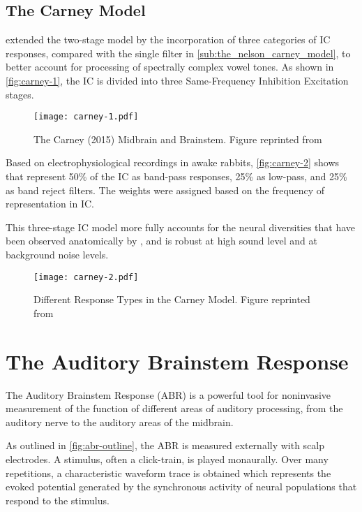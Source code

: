 \subsection{The Carney Model} %
\label{sub:the_carney_model}
\cite{Carney2015Speech} extended the two-stage \citeauthor{Nelson2004Phenomenological} model by the incorporation of three categories of IC responses, compared with the single filter in \autoref{sub:the_nelson_carney_model}, to better account for processing of spectrally complex vowel tones.  As shown in \autoref{fig:carney-1}, the IC is divided into three Same-Frequency Inhibition Excitation stages. 
\begin{figure}[htbp]
	\centering
	\texttt{[image: carney-1.pdf]}
	\caption[The Carney 2015 Model]{The Carney (2015) Midbrain and Brainstem.  Figure reprinted from~\cite{Carney2015Speech}}
	\label{fig:carney-1}
\end{figure}


Based on electrophysiological recordings in awake rabbits, \autoref{fig:carney-2} shows that \citeauthor{Carney2015Speech} represent 50\% of the IC as band-pass responses, 25\% as low-pass, and 25\% as band reject filters.  The weights were assigned based on the frequency of representation in IC.  

This three-stage IC model more fully accounts for the neural diversities that have been observed anatomically by \cite{Beebe2016Extracellular}, and is robust at high sound level and at background noise levels. 

\begin{figure}[htbp]
	\centering
	\texttt{[image: carney-2.pdf]}
	\caption[IC Response Types]{Different Response Types in the Carney Model.  Figure reprinted from~\cite{Carney2015Speech}}
	\label{fig:carney-2}
\end{figure}

\section{The Auditory Brainstem Response} %
\label{sec:the_auditory_brainstem_response}
The Auditory Brainstem Response (ABR) is a powerful tool for noninvasive measurement of the function of different areas of auditory processing, from the auditory nerve to the auditory areas of the midbrain. 

As outlined in \autoref{fig:abr-outline}, the ABR is measured externally with scalp electrodes.  A stimulus, often a click-train, is played monaurally.  Over many repetitions, a characteristic waveform trace is obtained which represents the evoked potential generated by the synchronous activity of neural populations that respond to the stimulus. 

